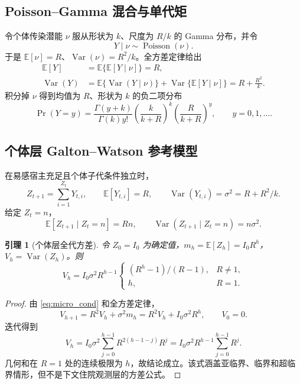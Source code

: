 \documentclass[11pt,a4paper]{article}
\newtheorem{lemma}[theorem]{引理}
\theoremstyle{remark}
\newcommand{\E}{\mathbb{E}}
\newcommand{\Var}{\operatorname{Var}}
\begin{document}
\subsection{Poisson--Gamma 混合与单代矩}
令个体传染潜能 $\nu$ 服从形状为 $k$、尺度为 $R/k$ 的 Gamma 分布，并令
\begin{equation}
Y\mid\nu\sim\operatorname{Poisson}(\nu).
\end{equation}
于是 $\E[\nu]=R$、$\Var(\nu)=R^2/k$。全方差定律给出
\begin{align}
\E[Y]&=\E\{\E[Y\mid\nu]\}=R,\\
\Var(Y)&=\E\{\Var(Y\mid\nu)\}+\Var\{\E[Y\mid\nu]\}
=R+\frac{R^2}{k}.
\end{align}
积分掉 $\nu$ 得到均值为 $R$、形状为 $k$ 的负二项分布
\begin{equation}
\Pr(Y=y)=\frac{\Gamma(y+k)}{\Gamma(k)y!}
\left(\frac{k}{k+R}\right)^k
\left(\frac{R}{k+R}\right)^y,\qquad y=0,1,\ldots .
\end{equation}

\subsection{个体层 Galton--Watson 参考模型}
在易感宿主充足且个体子代条件独立时，
\begin{equation}
Z_{t+1}=\sum_{i=1}^{Z_t}Y_{t,i},\qquad
\E[Y_{t,i}]=R,\qquad \Var(Y_{t,i})=\sigma^2=R+R^2/k.
\end{equation}
给定 $Z_t=n$，
\begin{equation}
\E[Z_{t+1}\mid Z_t=n]=Rn,\qquad
\Var(Z_{t+1}\mid Z_t=n)=n\sigma^2.\label{eq:micro_cond}
\end{equation}

\begin{lemma}[个体层全代方差]
令 $Z_0=I_0$ 为确定值，$m_h=\E[Z_h]=I_0R^h$，$V_h=\Var(Z_h)$。则
\begin{equation}
V_h=I_0\sigma^2R^{h-1}
\begin{cases}(R^h-1)/(R-1),&R\ne1,\\h,&R=1.\end{cases}\label{eq:micro_variance}
\end{equation}
\end{lemma}
\begin{proof}
由 \eqref{eq:micro_cond} 和全方差定律，
\begin{equation}
V_{h+1}=R^2V_h+\sigma^2m_h
=R^2V_h+I_0\sigma^2R^h,\qquad V_0=0.
\end{equation}
迭代得到
\begin{equation}
V_h=I_0\sigma^2\sum_{j=0}^{h-1}R^{2(h-1-j)}R^j
=I_0\sigma^2R^{h-1}\sum_{j=0}^{h-1}R^j.
\end{equation}
几何和在 $R=1$ 处的连续极限为 $h$，故结论成立。该式涵盖亚临界、临界和超临界情形，但不是下文住院观测层的方差公式。
\end{proof}
\end{document}
